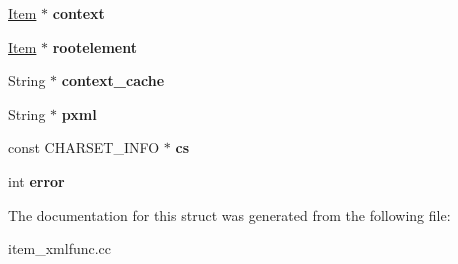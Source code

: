 \begin{DoxyCompactItemize}
\item 
\mbox{\label{structmy__xpath__st_af8b14d0fa3d565cd0181b14daba2c29f}} 
\mbox{\hyperlink{classItem}{Item}} $\ast$ {\bfseries context}
\item 
\mbox{\label{structmy__xpath__st_acda27a3141f3d08e2c644a613c625cec}} 
\mbox{\hyperlink{classItem}{Item}} $\ast$ {\bfseries rootelement}
\item 
\mbox{\label{structmy__xpath__st_ad02fa2ee27b09d291ac46ec2ee8dcd71}} 
String $\ast$ {\bfseries context\+\_\+cache}
\item 
\mbox{\label{structmy__xpath__st_a9813220fe582d12508e200faa552ea52}} 
String $\ast$ {\bfseries pxml}
\item 
\mbox{\label{structmy__xpath__st_a0ab7f37572347403e174fb0bdd376ebf}} 
const C\+H\+A\+R\+S\+E\+T\+\_\+\+I\+N\+FO $\ast$ {\bfseries cs}
\item 
\mbox{\label{structmy__xpath__st_aa4b7dfced49722df0cbcba339624e4c3}} 
int {\bfseries error}
\end{DoxyCompactItemize}


The documentation for this struct was generated from the following file\+:\begin{DoxyCompactItemize}
\item 
item\+\_\+xmlfunc.\+cc\end{DoxyCompactItemize}
